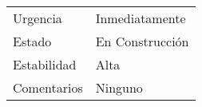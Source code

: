 \begin{table}[H]
\begin{tabular}{ll}
		Urgencia     & Inmediatamente                                                                                                                                                                                                       \\
		Estado       & En Construcci\'on                                                                                                                                                                                                      \\
		Estabilidad  & Alta                                                                                                                                                                                                                 \\
		Comentarios  & Ninguno                                                                                                                                                                                                             
	\end{tabular}
\end{table}

